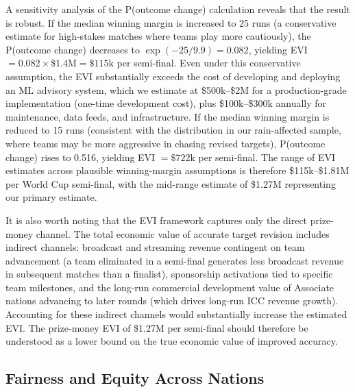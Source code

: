 \documentclass[10pt,a4paper,twocolumn]{article}
\begin{document}
A sensitivity analysis of the P(outcome change) calculation reveals that the result is robust. If the median winning margin is increased to 25 runs (a conservative estimate for high-stakes matches where teams play more cautiously), the P(outcome change) decreases to $\exp(-25/9.9) = 0.082$, yielding EVI $= 0.082 \times \$1.4\text{M} = \$115\text{k}$ per semi-final. Even under this conservative assumption, the EVI substantially exceeds the cost of developing and deploying an ML advisory system, which we estimate at \$500k--\$2M for a production-grade implementation (one-time development cost), plus \$100k--\$300k annually for maintenance, data feeds, and infrastructure. If the median winning margin is reduced to 15 runs (consistent with the distribution in our rain-affected sample, where teams may be more aggressive in chasing revised targets), P(outcome change) rises to 0.516, yielding EVI $= \$722\text{k}$ per semi-final. The range of EVI estimates across plausible winning-margin assumptions is therefore \$115k--\$1.81M per World Cup semi-final, with the mid-range estimate of \$1.27M representing our primary estimate.

It is also worth noting that the EVI framework captures only the direct prize-money channel. The total economic value of accurate target revision includes indirect channels: broadcast and streaming revenue contingent on team advancement (a team eliminated in a semi-final generates less broadcast revenue in subsequent matches than a finalist), sponsorship activations tied to specific team milestones, and the long-run commercial development value of Associate nations advancing to later rounds (which drives long-run ICC revenue growth). Accounting for these indirect channels would substantially increase the estimated EVI. The prize-money EVI of \$1.27M per semi-final should therefore be understood as a lower bound on the true economic value of improved accuracy.

\subsection{Fairness and Equity Across Nations}
\end{document}
